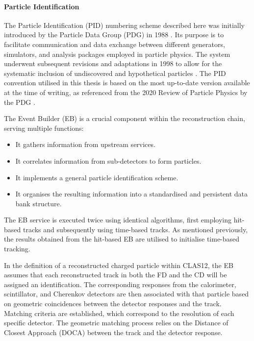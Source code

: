 \paragraph{Particle Identification}
    The Particle Identification (PID) numbering scheme described here was initially introduced by the Particle Data Group (PDG) in 1988 \cite{yost1988}.
    Its purpose is to facilitate communication and data exchange between different generators, simulators, and analysis packages employed in particle physics.
    The system underwent subsequent revisions and adaptations in 1998 to allow for the systematic inclusion of undiscovered and hypothetical particles \cite{particle1998}.
    The PID convention utilised in this thesis is based on the most up-to-date version available at the time of writing, as referenced from the 2020 Review of Particle Physics by the PDG \cite{particle2020}.

    The Event Builder (EB) is a crucial component within the reconstruction chain, serving multiple functions:
    \begin{itemize}
        \item
            It gathers information from upstream services.
        \item
            It correlates information from sub-detectors to form particles.
        \item
            It implements a general particle identification scheme.
        \item
            It organises the resulting information into a standardised and persistent data bank structure.
    \end{itemize}

    The EB service is executed twice using identical algorithms, first employing hit-based tracks and subsequently using time-based tracks.
    As mentioned previously, the results obtained from the hit-based EB are utilised to initialise time-based tracking.

    In the definition of a reconstructed charged particle within CLAS12, the EB assumes that each reconstructed track in both the FD and the CD will be assigned an identification.
    The corresponding responses from the calorimeter, scintillator, and Cherenkov detectors are then associated with that particle based on geometric coincidences between the detector responses and the track.
    Matching criteria are established, which correspond to the resolution of each specific detector.
    The geometric matching process relies on the Distance of Closest Approach (DOCA) between the track and the detector response.

